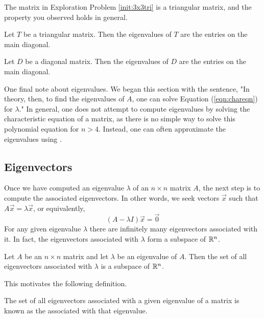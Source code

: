 \documentclass{ximera}
\begin{document}
The matrix in Exploration Problem \ref{init:3x3tri} is a triangular matrix, and the property you observed holds in general.
    
\begin{theorem}\label{th:eigtri}
Let $T$ be a triangular matrix.  Then the eigenvalues of $T$ are the entries on the main diagonal.
\end{theorem}
    
    
\begin{corollary}\label{th:eigdiag}
Let $D$ be a diagonal matrix.  Then the eigenvalues of $D$ are the entries on the main diagonal.
\end{corollary}
    
One final note about eigenvalues.  We began this section with the sentence, "In theory, then, to find the eigenvalues of $A$, one can solve Equation (\ref{eqn:chareqn}) for $\lambda$."  In general, one does not attempt to compute eigenvalues by solving the characteristic equation of a matrix, as there is no simple way to solve this polynomial equation for $n>4$.  Instead, one can often approximate the eigenvalues using .

    
\subsection*{Eigenvectors}
Once we have computed an eigenvalue $\lambda$ of an $n \times n$ matrix $A$, the next step is to compute the associated eigenvectors.  In other words, we seek vectors $\vec{x}$ such that $A\vec{x}=\lambda \vec{x}$, or equivalently,
\begin{equation}\label{eqn:nullspace}
    (A-\lambda I) \vec{x}=\vec{0}  
\end{equation}
For any given eigenvalue $\lambda$ there are infinitely many eigenvectors associated with it.  In fact, the eigenvectors associated with $\lambda$ form a subspace of $\mathbb{R}^n$.
    
\begin{theorem}\label{th:eigenspace}
    Let $A$ be an $n\times n$ matrix and let $\lambda$ be an eigenvalue of $A$.  Then the set of all eigenvectors associated with $\lambda$ is a subspace of $\mathbb{R}^n$.
\end{theorem}
    
This motivates the following definition.
    
\begin{definition}\label{def:eigspace}
The set of all eigenvectors associated with a given eigenvalue of a matrix is known as the  associated with that eigenvalue.
\end{definition}
    
\end{document}

